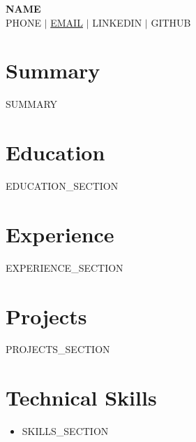 \documentclass[letterpaper,11pt]{article}
\begin{document}
\begin{center}
    \textbf{\Huge \scshape {{NAME}}} \\ \vspace{1pt}
    \small {{PHONE}} $|$ \href{mailto:{{EMAIL}}}{{EMAIL}} $|$ {{LINKEDIN}} $|$ {{GITHUB}}
\end{center}

\section{Summary}
\small{{{SUMMARY}}}

\section{Education}
\begin{itemize}[leftmargin=0.15in, label={}]
{{EDUCATION_SECTION}}
\end{itemize}

\section{Experience}
\begin{itemize}[leftmargin=0.15in, label={}]
{{EXPERIENCE_SECTION}}
\end{itemize}

\section{Projects}
\begin{itemize}[leftmargin=0.15in, label={}]
{{PROJECTS_SECTION}}
\end{itemize}

\section{Technical Skills}
\begin{itemize}[leftmargin=0.15in, label={}]
  \item \small{
    {{SKILLS_SECTION}}
  }
\end{itemize}
\end{document}
